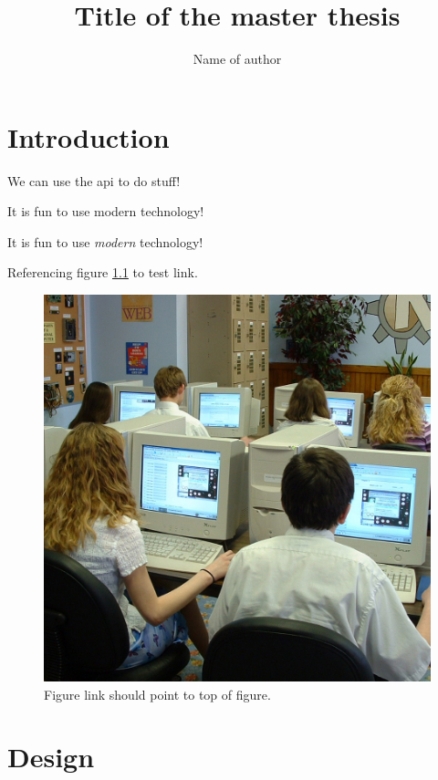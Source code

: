 \documentclass[final,10pt]{../../uit-thesis}
\begin{document}

\title{Title of the master thesis}
\author{Name of author}


\maketitle

\frontmatter

\tableofcontents


\printglossaries
{}

\mainmatter

\chapter{Introduction}
\lipsum[1]
\lipsum[1]
\lipsum[1-7]

We can use the \ac{api} to do stuff!

It is fun to use modern  technology!

It is fun to use \emph{modern } technology!

Referencing figure \ref{fig:ex} to test link.

\begin{figure}\label{fig:ex}
\centering
\includegraphics[scale=0.1]{748443511_095ae916df_o.jpg}
\caption{Figure link should point to top of figure.}
\end{figure}

\chapter{Design}
\lipsum[8-10]

\backmatter
\end{document}

